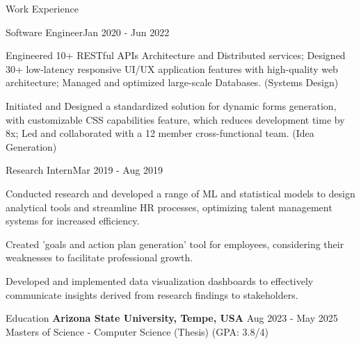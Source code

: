 \documentclass{resume} %
\begin{document}
    \begin{rSection}{Work Experience}
                    \begin{rSubsection}
                {Software Engineer}{Jan 2020 - Jun 2022}
                                    {}
                                {}
                                    \item Engineered 10+ RESTful APIs Architecture and Distributed services; Designed 30+ low{-}latency responsive UI/UX application features with high{-}quality web architecture; Managed and optimized large{-}scale Databases. (Systems Design)
                                    \item Initiated and Designed a standardized solution for dynamic forms generation, with customizable CSS capabilities feature, which reduces development time by 8x; Led and collaborated with a 12 member cross{-}functional team. (Idea Generation)
                            \end{rSubsection}
                    \begin{rSubsection}
                {Research Intern}{Mar 2019 - Aug 2019}
                                    {}
                                {}
                                    \item Conducted research and developed a range of ML and statistical models to design analytical tools and streamline HR processes, optimizing talent management systems for increased efficiency.
                                    \item Created 'goals and action plan generation' tool for employees, considering their weaknesses to facilitate professional growth.
                                    \item Developed and implemented data visualization dashboards to effectively communicate insights derived from research findings to stakeholders.
                            \end{rSubsection}
            \end{rSection}

\begin{rSection}{Education}
                        \textbf{Arizona State University, Tempe, USA} \hfill {Aug 2023 - May 2025} \\
                            {Masters of Science {-} Computer Science (Thesis)}
                                        \hfill {(GPA: 3.8/4)}
             
             
         
    \end{rSection}
\end{document}
